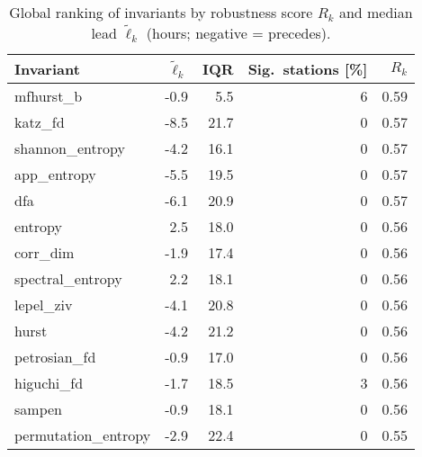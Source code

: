 
\begin{table}[t]
\centering
\small
\caption{Global ranking of invariants by robustness score $R_k$ and median lead $\widetilde{\ell}_k$ (hours; negative = precedes).}
\label{tab:rank_global}
\begin{tabular}{@{}l r r r r@{}}
\toprule
\textbf{Invariant} & $\widetilde{\ell}_k$ & IQR & Sig.\ stations [\%] & $R_k$ \\
\midrule
mfhurst\_b & -0.9 & 5.5 & 6 & 0.59 \\
katz\_fd & -8.5 & 21.7 & 0 & 0.57 \\
shannon\_entropy & -4.2 & 16.1 & 0 & 0.57 \\
app\_entropy & -5.5 & 19.5 & 0 & 0.57 \\
dfa & -6.1 & 20.9 & 0 & 0.57 \\
entropy & 2.5 & 18.0 & 0 & 0.56 \\
corr\_dim & -1.9 & 17.4 & 0 & 0.56 \\
spectral\_entropy & 2.2 & 18.1 & 0 & 0.56 \\
lepel\_ziv & -4.1 & 20.8 & 0 & 0.56 \\
hurst & -4.2 & 21.2 & 0 & 0.56 \\
petrosian\_fd & -0.9 & 17.0 & 0 & 0.56 \\
higuchi\_fd & -1.7 & 18.5 & 3 & 0.56 \\
sampen & -0.9 & 18.1 & 0 & 0.56 \\
permutation\_entropy & -2.9 & 22.4 & 0 & 0.55 \\
\bottomrule
\end{tabular}
\end{table}

